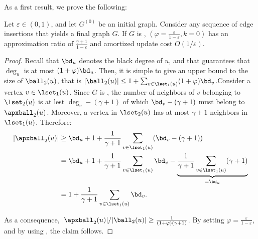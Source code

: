 As a first result, we prove the following:

\begin{theorem}\label{lemma:gamma-ok-error-bound-balls}
    
Let $\varepsilon \in (0,1)$, and let $G^{(0)}$ be an initial graph. Consider any sequence of edge insertions that yields a final graph $G$. If $G$ is \gammaok, \lazyscheme$(\varphi = \frac{\varepsilon}{1 - \varepsilon},k=0)$ has an approximation ratio of  $\frac{\gamma + 1}{1-\varepsilon}$ and amortized update cost $O(1/\varepsilon)$. 
    
\end{theorem}
\begin{proof}
Recall that $\bd_u$ denotes the black degree of $u$, and that   guarantees that $\deg_u$ is at most $(1+\varphi)\bd_u$.
    Then, it is simple to give an upper bound to the size of $\ball_2(u)$, that is $\vert \ball_2(u) \vert \leq 1+ \sum_{v \in \lset_1(u)} (1 + \varphi)\bd_v$.Consider a vertex $v \in \lset_1(u)$. Since $G$ is \gammaok, the number of neighbors of $v$ belonging to $\lset_2(u)$ is at lest $\deg_v - (\gamma+1)$ of which $\bd_v - (\gamma+1)$ must belong to $\apxball_2(u)$. Moreover, a vertex in $\lset_2(u)$ has at most $\gamma+1$ neighbors in $\lset_1(u)$. Therefore: 
    \begin{align*}
    \vert \apxball_2(u) \vert
    &\geq  \bd_u + 1 + \frac{1}{\gamma + 1}\sum_{v \in \lset_1(u)}(\bd_v - (\gamma + 1))\\
    &= \bd_u + 1 + \frac{1}{\gamma + 1}\sum_{v \in \lset_1(u)}\bd_v - \underbrace{\frac{1}{\gamma + 1}\sum_{v \in \lset_1(u)}(\gamma + 1)}_{= \bd_u}\\
    &= 1+ \frac{1}{\gamma + 1}\sum_{v \in \lset_1(u)}\bd_v.
    \end{align*}
  
    As a consequence, $\vert \apxball_2(u) \vert/\vert \ball_2(u) \vert \ge \frac{1}{(1+\varphi)(\gamma+1)}$. By setting $\varphi = \frac{\varepsilon}{1 - \varepsilon}$, and by using ,  the claim follows.
\end{proof}

\iffalse
\begin{algorithm}
\DontPrintSemicolon
\SetAlgoLined
\SetKwFunction{FMain}{Prune}
\SetKwProg{Fn}{Procedure}{:}{end}
\Fn{\FMain{$G, u$}}{
    $E_p \gets E$\;
    \For{$w \in \lset_2(u)$}{
        \If{$\exists v\in \lset_1(u)$ s.t. $(v,w) \in E_p$ is \emph{black}}{
            let $D =\{ (\overline{v},w) \in E_p: \overline{v} \in \lset_1(u)$ and $ (\overline{v},w)$ is red$\}$\;
            $E_p \gets E_p \setminus D$\;
        } \Else{
            let $D =\{ (v,w) \in E_p: v \in \lset_1(u)$ and $ (v,w)$ is red$\}$\;
            let $e\in D$\;
            $D \gets D \setminus \{e\}$\;
            $E_p \gets E_p \setminus D$\;
        }   
    }
    \Return{$G_p = (V,E_p)$}
}

\caption{Pruning}
\label{alg:prune_procedure}
\end{algorithm}
\fi

